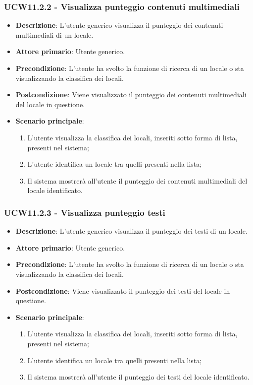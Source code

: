 \subsubsection{UCW11.2.2 - Visualizza punteggio contenuti multimediali}
\begin{itemize}
    \item \textbf{Descrizione}: L'utente generico visualizza il punteggio dei contenuti multimediali di un locale.
    \item \textbf{Attore primario}: Utente generico.
    \item \textbf{Precondizione}: L'utente ha svolto la funzione di ricerca di un locale o sta visualizzando la classifica dei locali.
    \item \textbf{Postcondizione}: Viene visualizzato il punteggio dei contenuti multimediali del locale in questione.
    \item \textbf{Scenario principale}: 
    \begin{enumerate}
        \item L'utente visualizza la classifica dei locali, inseriti sotto forma di lista, presenti nel sistema;
        \item L'utente identifica un locale tra quelli presenti nella lista;
        \item Il sistema mostrerà all'utente il punteggio dei contenuti multimediali del locale identificato.
        \end{enumerate}
\end{itemize}
\subsubsection{UCW11.2.3 - Visualizza punteggio testi}
\begin{itemize}
    \item \textbf{Descrizione}: L'utente generico visualizza il punteggio dei testi di un locale.
    \item \textbf{Attore primario}: Utente generico.
    \item \textbf{Precondizione}: L'utente ha svolto la funzione di ricerca di un locale o sta visualizzando la classifica dei locali.
    \item \textbf{Postcondizione}: Viene visualizzato il punteggio dei testi del locale in questione.
    \item \textbf{Scenario principale}: 
    \begin{enumerate}
        \item L'utente visualizza la classifica dei locali, inseriti sotto forma di lista, presenti nel sistema;
        \item L'utente identifica un locale tra quelli presenti nella lista;
        \item Il sistema mostrerà all'utente il punteggio dei testi del locale identificato.
        \end{enumerate}
\end{itemize}
